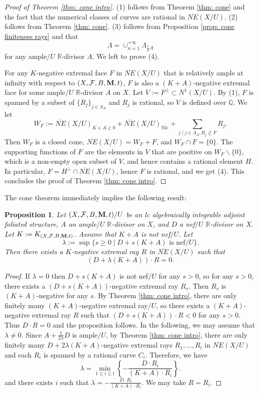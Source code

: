 \documentclass[12pt]{amsart}
\numberwithin{equation}{section}
\newcommand{\Mm}{{\bf{M}}}
\newcommand{\Qq}{\mathbb{Q}}
\newcommand{\Rr}{\mathbb{R}}
\newcommand{\Nlc}{\operatorname{Nlc}}
\newcommand{\Ff}{\mathcal{F}}
\newtheorem{prop}[thm]{Proposition}
\theoremstyle{definition}
\theoremstyle{definition}
\theoremstyle{definition}
\begin{document}
\begin{proof}[Proof of Theorem \ref{thm: cone intro}]
    (1) follows from Theorem \ref{thm: cone} and the fact that the numerical classes of curves are rational in $\overline{NE}(X/U)$. (2) follows from Theorem \ref{thm: cone}. (3) follows from Proposition \ref{prop: cone finiteness rays} and that 
    $$\Lambda=\cup_{n=1}^{+\infty}\Lambda_{\frac{1}{n}A}$$
    for any ample$/U$ $\Rr$-divisor $A$. We left to prove (4).

     For any $K$-negative extremal face $F$ in $\overline{NE}(X/U)$ that is relatively ample at infinity with respect to $(X,\Ff,B,\Mm,t)$, $F$ is also a $(K+A)$-negative extremal face for some ample$/U$ $\Rr$-divisor $A$ on $X$. Let $V:=F^\bot\subset N^1(X/U)$. By (1), $F$ is spanned by a subset of $\{R_j\}_{j\in\Lambda_A}$ and $R_j$ is rational, so $V$ is defined over $\Qq$. We let
$$W_F:=\overline{NE}(X/U)_{K+A\geq 0}+\overline{NE}(X/U)_{\Nlc}+\sum_{j\mid j\in\Lambda_A,R_j\not\subset F}R_j.$$
Then $W_F$ is a closed cone, $\overline{NE}(X/U)=W_F+F$, and $W_F\cap F=\{0\}$. The supporting functions of $F$ are the elements in $V$ that are positive on $W_F\backslash\{0\}$, which is a non-empty open subset of $V$, and hence contains a rational element $H$. In particular, $F=H^\bot\cap \overline{NE}(X/U)$, hence $F$ is rational, and we get (4). This concludes the proof of Theorem \ref{thm: cone intro}.
\end{proof}

The cone theorem immediately implies the following result:

\begin{prop}
    Let $(X,\Ff,B,\Mm,t)/U$ be an lc algebraically integrable adjoint foliated structure, $A$ an ample$/U$ $\Rr$-divisor on $X$, and $D$ a nef$/U$ $\Rr$-divisor on $X$. Let $K:=K_{(X,\Ff,B,\Mm,t)}$. Assume that $K+A$ is not nef$/U$. Let
    $$\lambda:=\sup\{s\geq 0\mid D+s(K+A)\text{ is nef}/U\}.$$
    Then there exists a $K$-negative extremal ray $R$ in $\overline{NE}(X/U)$ such that
    $$(D+\lambda(K+A))\cdot R=0.$$
\end{prop}
\begin{proof}
If $\lambda=0$ then $D+s(K+A)$ is not nef$/U$ for any $s>0$, so for any $s>0$, there exists a  $(D+s(K+A))$-negative extremal ray $R_s$. Then $R_s$ is $(K+A)$-negative for any $s$. By Theorem \ref{thm: cone intro}, there are only finitely many $(K+A)$-negative extremal ray$/U$, so there exists a $(K+A)$-negative extremal ray $R$ such that $(D+s(K+A))\cdot R<0$ for any $s>0$. Thus $D\cdot R=0$ and the proposition follows. In the following, we may assume that $\lambda\not=0$. 
    Since $A+\frac{1}{2\lambda}D$ is ample$/U$, by Theorem \ref{thm: cone intro}, there are only finitely many $D+2\lambda(K+A)$-negative extremal rays $R_1,\dots,R_l$ in $\overline{NE}(X/U)$ and each $R_i$ is spanned by a rational curve $C_i$. Therefore, we have
    $$\lambda=\min_{1\leq i\leq l}\left\{-\frac{D\cdot R_i}{(K+A)\cdot R_i}\right\}.$$
    and there exists $i$ such that $\lambda=-\frac{D\cdot R_i}{(K+A)\cdot R_i}$. We may take $R=R_i$.
\end{proof}
 
\end{document}
